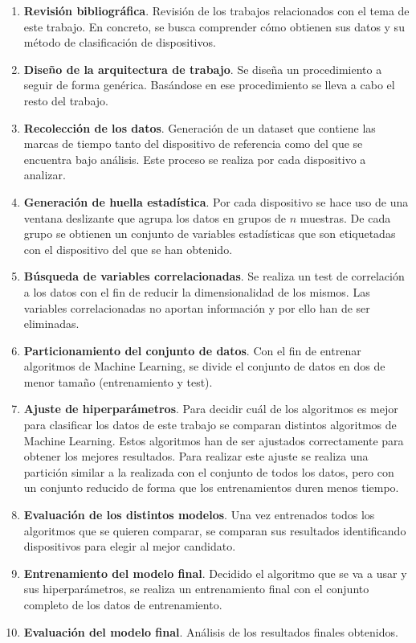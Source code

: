 \begin{enumerate}
    \item \textbf{Revisión bibliográfica}. Revisión de los trabajos relacionados con el tema de este trabajo. En concreto, se busca comprender cómo obtienen sus datos y su método de clasificación de dispositivos.
    \item \textbf{Diseño de la arquitectura de trabajo}. Se diseña un procedimiento a seguir de forma genérica. Basándose en ese procedimiento se lleva a cabo el resto del trabajo.
    \item \textbf{Recolección de los datos}. Generación de un dataset que contiene las marcas de tiempo tanto del dispositivo de referencia como del que se encuentra bajo análisis. Este proceso se realiza por cada dispositivo a analizar.
    \item \textbf{Generación de huella estadística}. Por cada dispositivo se hace uso de una ventana deslizante que agrupa los datos en grupos de $n$ muestras. De cada grupo se obtienen un conjunto de variables estadísticas que son etiquetadas con el dispositivo del que se han obtenido.
    \item \textbf{Búsqueda de variables correlacionadas}. Se realiza un test de correlación a los datos con el fin de reducir la dimensionalidad de los mismos. Las variables correlacionadas no aportan información y por ello han de ser eliminadas.
    \item \textbf{Particionamiento del conjunto de datos}. Con el fin de entrenar algoritmos de Machine Learning, se divide el conjunto de datos en dos de menor tamaño (entrenamiento y test).
    \item \textbf{Ajuste de hiperparámetros}. Para decidir cuál de los algoritmos es mejor para clasificar los datos de este trabajo se comparan distintos algoritmos de Machine Learning. Estos algoritmos han de ser ajustados correctamente para obtener los mejores resultados. Para realizar este ajuste se realiza una partición similar a la realizada con el conjunto de todos los datos, pero con un conjunto reducido de forma que los entrenamientos duren menos tiempo.
    \item \textbf{Evaluación de los distintos modelos}. Una vez entrenados todos los algoritmos que se quieren comparar, se comparan sus resultados identificando dispositivos para elegir al mejor candidato.
    \item \textbf{Entrenamiento del modelo final}. Decidido el algoritmo que se va a usar y sus hiperparámetros, se realiza un entrenamiento final con el conjunto completo de los datos de entrenamiento.
    \item \textbf{Evaluación del modelo final}. Análisis de los resultados finales obtenidos.
\end{enumerate}
